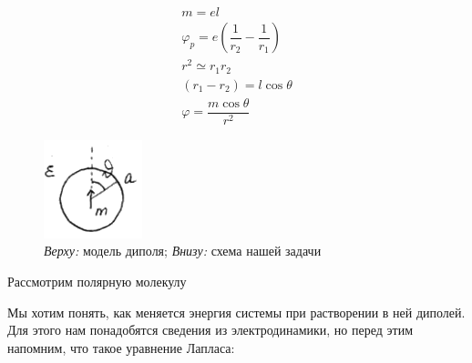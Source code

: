 \begin{lecture}
\begin{lecSection}
		\begin{gather*}
			m = e l \\
			\varphi_p = e \left( \dfrac{1}{r_2} - \dfrac{1}{r_1} \right) \\
			r^2 \simeq r_1 r_2 \\
			(r_1 - r_2) = l \cos \theta \\
			\varphi = \dfrac{m \cos \theta}{r^2}
		\end{gather*}
				\begin{figure}
			\centering\includegraphics[width=\linewidth]{lecture_08/new_polar_sphere}
			\caption{
				\textit{Верху:} модель диполя; 
				\newline \textit{Внизу:} схема нашей задачи
			}
			\label{fig:polar_sphere}
		\end{figure}
		Рассмотрим полярную молекулу
	
		Мы хотим понять, как меняется энергия системы при растворении в ней диполей. Для этого нам понадобятся сведения из электродинамики, но перед этим напомним, что такое уравнение Лапласа:
		

\end{lecSection}
\end{lecture}
